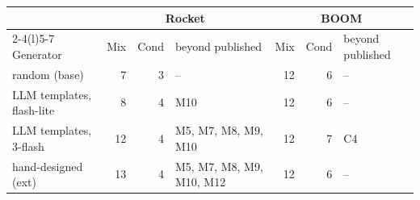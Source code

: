 \begin{tabular}{@{}l r r l r r l@{}}\toprule
& \multicolumn{3}{c}{Rocket} & \multicolumn{3}{c}{BOOM}\\\cmidrule(lr){2-4}\cmidrule(l){5-7}
Generator & Mix & Cond & beyond published & Mix & Cond & beyond published\\\midrule
random (base) & 7 & 3 & -- & 12 & 6 & --\\
LLM templates, flash-lite & 8 & 4 & M10 & 12 & 6 & --\\
LLM templates, 3-flash & 12 & 4 & M5, M7, M8, M9, M10 & 12 & 7 & C4\\
hand-designed (ext) & 13 & 4 & M5, M7, M8, M9, M10, M12 & 12 & 6 & --\\
\bottomrule\end{tabular}